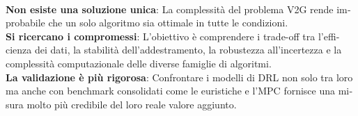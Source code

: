 \documentclass[a4paper,12pt]{report}
\begin{document}
\begin{otherlanguage}{italian}
\\
\textbf{Non esiste una soluzione unica}: La complessità del problema V2G rende improbabile che un solo algoritmo sia ottimale in tutte le condizioni.
\\
\textbf{Si ricercano i compromessi}: L'obiettivo è comprendere i trade-off tra l'efficienza dei dati, la stabilità dell'addestramento, la robustezza all'incertezza e la complessità computazionale delle diverse famiglie di algoritmi.
\\
\textbf{La validazione è più rigorosa}: Confrontare i modelli di DRL non solo tra loro ma anche con benchmark consolidati come le euristiche e l'MPC fornisce una misura molto più credibile del loro reale valore aggiunto.

\end{otherlanguage}
\newpage


\newpage


\clearpage

\clearpage

\clearpage



\printbibliography
\end{document}

